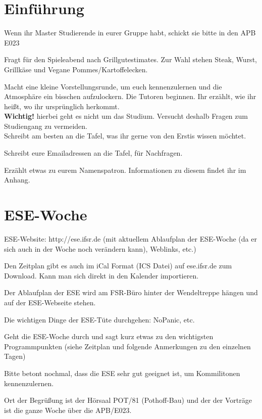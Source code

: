 \documentclass[a4paper,12pt]{report}
\begin{document}
\section{Einführung}
\begin{itemize*}
\item Wenn ihr Master Studierende in eurer Gruppe habt, schickt sie bitte in den APB E023
\item Fragt für den Spieleabend nach Grillgutestimates. Zur Wahl stehen Steak, Wurst, Grillkäse und Vegane Pommes/Kartoffelecken.
\item Macht eine kleine Vorstellungsrunde, um euch kennenzulernen und die Atmosphäre ein bisschen aufzulockern.
Die Tutoren beginnen. Ihr erzählt, wie ihr heißt, wo ihr ursprünglich herkommt.\\
\textbf{Wichtig!} hierbei geht es nicht um das Studium. Versucht deshalb Fragen zum Studiengang zu vermeiden.\\
Schreibt am besten an die Tafel, was ihr gerne von den Erstis wissen möchtet.
\item Schreibt eure Emailadressen an die Tafel, für Nachfragen.
\item Erzählt etwas zu eurem Namenspatron. Informationen zu diesem findet ihr im Anhang.
\end{itemize*}

\section{ESE-Woche}
\begin{itemize*}
\item ESE-Website: http://ese.ifsr.de (mit aktuellem Ablaufplan der ESE-Woche (da er sich auch in der Woche noch verändern kann), Weblinks, etc.)
\item Den Zeitplan gibt es auch im iCal Format (ICS Datei) auf ese.ifsr.de zum Download.
Kann man sich direkt in den Kalender importieren.
\item Der Ablaufplan der ESE wird am FSR-Büro hinter der Wendeltreppe hängen und auf der ESE-Webseite stehen.
\item Die wichtigen Dinge der ESE-Tüte durchgehen: NoPanic, etc.
\item Geht die ESE-Woche durch und sagt kurz etwas zu den wichtigsten Programmpunkten (siehe Zeitplan und folgende Anmerkungen zu den einzelnen Tagen)
\item Bitte betont nochmal, dass die ESE sehr gut geeignet ist, um Kommilitonen kennenzulernen.
\end{itemize*}
Ort der Begrüßung ist der Hörsaal POT/81 (Pothoff-Bau) und der der Vorträge ist die ganze Woche über die APB/E023.
\end{document}
